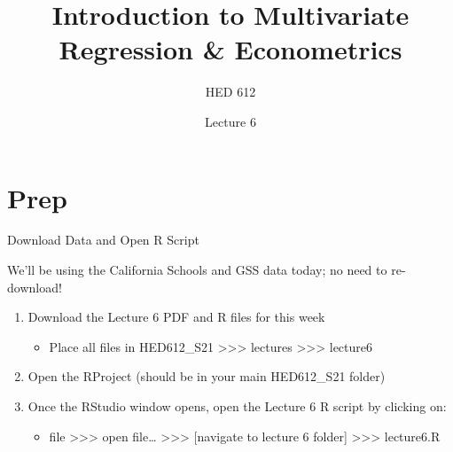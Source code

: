 \documentclass[
  8pt,
  ignorenonframetext,
  dvipsnames]{beamer}
\title{Introduction to Multivariate Regression \& Econometrics}
\subtitle{HED 612}
\author{Lecture 6}
\date{}
\providecommand{\tightlist}{%
  \setlength{\itemsep}{0pt}\setlength{\parskip}{0pt}}
\let\olditem\item
\renewcommand{\item}{%
  \olditem\vspace{4pt}
}
\begin{document}
\frame{\titlepage}

\begin{frame}
  \tableofcontents[hideallsubsections]
\end{frame}
\hypertarget{prep}{%
\section{Prep}\label{prep}}

\begin{frame}{Download Data and Open R Script}
\protect\hypertarget{download-data-and-open-r-script}{}

We'll be using the California Schools and GSS data today; no need to
re-download!

\medskip

\begin{enumerate}
\tightlist
\item
  Download the Lecture 6 PDF and R files for this week

  \begin{itemize}
  \tightlist
  \item
    Place all files in HED612\_S21
    \textgreater\textgreater\textgreater{} lectures
    \textgreater\textgreater\textgreater{} lecture6
  \end{itemize}
\item
  Open the RProject (should be in your main HED612\_S21 folder)
\item
  Once the RStudio window opens, open the Lecture 6 R script by clicking
  on:

  \begin{itemize}
  \tightlist
  \item
    file \textgreater\textgreater\textgreater{} open file\ldots{}
    \textgreater\textgreater\textgreater{} {[}navigate to lecture 6
    folder{]} \textgreater\textgreater\textgreater{} lecture6.R
  \end{itemize}
\end{enumerate}

\end{frame}
\end{document}
